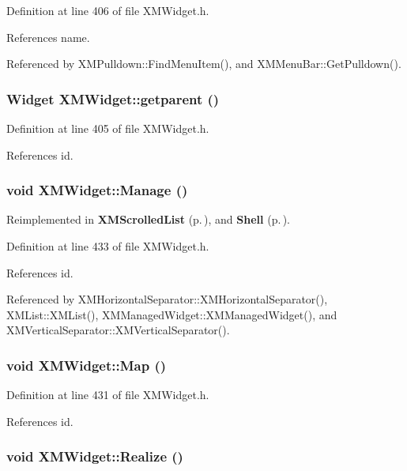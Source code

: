 Definition at line 406 of file XMWidget.h.

References name.

Referenced by XMPulldown::Find\-Menu\-Item(), and XMMenu\-Bar::Get\-Pulldown().
\subsubsection{\setlength{\rightskip}{0pt plus 5cm}Widget XMWidget::getparent ()\hspace{0.3cm}{\tt  [inline]}}\label{classXMWidget_a7}




Definition at line 405 of file XMWidget.h.

References id.
\subsubsection{\setlength{\rightskip}{0pt plus 5cm}void XMWidget::Manage ()\hspace{0.3cm}{\tt  [inline]}}\label{classXMWidget_a16}




Reimplemented in {\bf XMScrolled\-List} {\rm (p.\,\pageref{classXMScrolledList_a3})}, and {\bf Shell} {\rm (p.\,\pageref{classShell_a9})}.

Definition at line 433 of file XMWidget.h.

References id.

Referenced by XMHorizontal\-Separator::XMHorizontal\-Separator(), XMList::XMList(), XMManaged\-Widget::XMManaged\-Widget(), and XMVertical\-Separator::XMVertical\-Separator().
\subsubsection{\setlength{\rightskip}{0pt plus 5cm}void XMWidget::Map ()\hspace{0.3cm}{\tt  [inline]}}\label{classXMWidget_a14}




Definition at line 431 of file XMWidget.h.

References id.
\subsubsection{\setlength{\rightskip}{0pt plus 5cm}void XMWidget::Realize ()\hspace{0.3cm}{\tt  [inline]}}\label{classXMWidget_a18}




